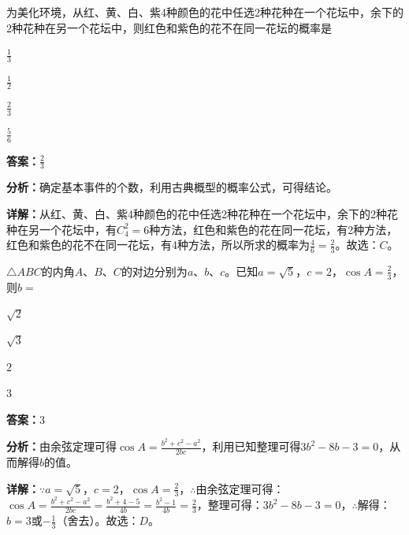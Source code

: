 \begin{question}[points=5]
为美化环境，从红、黄、白、紫4种颜色的花中任选2种花种在一个花坛中，余下的2种花种在另一个花坛中，则红色和紫色的花不在同一花坛的概率是
\begin{choices}
  \item $\frac{1}{3}$
  \item $\frac{1}{2}$
  \item $\frac{2}{3}$
  \item $\frac{5}{6}$
\end{choices}
\begin{solution}
\textbf{答案：}$\frac{2}{3}$

\textbf{分析：}确定基本事件的个数，利用古典概型的概率公式，可得结论。

\textbf{详解：}从红、黄、白、紫4种颜色的花中任选2种花种在一个花坛中，余下的2种花种在另一个花坛中，有$C_4^2=6$种方法，红色和紫色的花在同一花坛，有2种方法，红色和紫色的花不在同一花坛，有4种方法，所以所求的概率为$\frac{4}{6}=\frac{2}{3}$。故选：$C$。
\end{solution}
\end{question}

\begin{question}[points=5]
$\triangle ABC$的内角$A$、$B$、$C$的对边分别为$a$、$b$、$c$。已知$a=\sqrt{5}$，$c=2$，$\cos A=\frac{2}{3}$，则$b=$
\begin{choices}
  \item $\sqrt{2}$
  \item $\sqrt{3}$
  \item $2$
  \item $3$
\end{choices}
\begin{solution}
\textbf{答案：}$3$

\textbf{分析：}由余弦定理可得$\cos A=\frac{b^2+c^2-a^2}{2bc}$，利用已知整理可得$3b^2-8b-3=0$，从而解得$b$的值。

\textbf{详解：}$\because a=\sqrt{5}$，$c=2$，$\cos A=\frac{2}{3}$，$\therefore$由余弦定理可得：$\cos A=\frac{b^2+c^2-a^2}{2bc}=\frac{b^2+4-5}{4b}=\frac{b^2-1}{4b}=\frac{2}{3}$，整理可得：$3b^2-8b-3=0$，$\therefore$解得：$b=3$或$-\frac{1}{3}$（舍去）。故选：$D$。
\end{solution}
\end{question}

